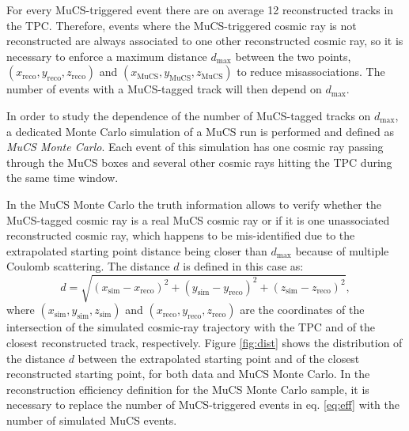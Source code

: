 \documentclass[a4paper,11pt]{article}
\begin{document}
For every MuCS-triggered event there are on average 12 reconstructed tracks in the TPC. Therefore, events where the MuCS-triggered cosmic ray is not reconstructed are always associated to one other reconstructed cosmic ray, so it is necessary to enforce a maximum distance $d_{\mathrm{max}}$ between the two points, $(x_{\mathrm{reco}},y_{\mathrm{reco}},z_{\mathrm{reco}})$ and $(x_{\mathrm{MuCS}},y_{\mathrm{MuCS}},z_{\mathrm{MuCS}})$ to reduce misassociations. The number of events with a MuCS-tagged track will then depend on $d_{\mathrm{max}}$.

In order to study the dependence of the number of MuCS-tagged tracks on $d_{\mathrm{max}}$, a dedicated Monte Carlo simulation of a MuCS run is performed and defined as \emph{MuCS Monte Carlo}. Each event of this simulation has one cosmic ray passing through the MuCS boxes and several other cosmic rays hitting the TPC during the same time window.

In the MuCS Monte Carlo the truth information allows to verify whether the MuCS-tagged cosmic ray is a real MuCS cosmic ray or if it is one unassociated reconstructed cosmic ray, which happens to be mis-identified due to the extrapolated starting point distance being closer than $d_{\mathrm{max}}$ because of multiple Coulomb scattering.
The distance $d$ is defined in this case as:
\begin{equation}\label{eq:d_mc}
d = \sqrt{(x_{\mathrm{sim}}-x_{\mathrm{reco}})^2+(y_{\mathrm{sim}}-y_{\mathrm{reco}})^2+(z_{\mathrm{sim}}-z_{\mathrm{reco}})^2},
\end{equation}
where $(x_{\mathrm{sim}},y_{\mathrm{sim}},z_{\mathrm{sim}})$ and $(x_{\mathrm{reco}},y_{\mathrm{reco}},z_{\mathrm{reco}})$ are the coordinates of the intersection of the simulated cosmic-ray trajectory with the TPC and of the closest reconstructed track, respectively. Figure \ref{fig:dist} shows the distribution of the distance $d$ between the extrapolated starting point and of the closest reconstructed starting point, for both data and MuCS Monte Carlo.
In the reconstruction efficiency definition for the MuCS Monte Carlo sample, it is necessary to replace the number of MuCS-triggered events in eq. \eqref{eq:eff} with the number of simulated MuCS events.
\end{document}
